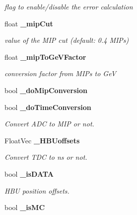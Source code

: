 \begin{DoxyCompactItemize}
\begin{DoxyCompactList}\small\item\em flag to enable/disable the error calculation \item\end{DoxyCompactList}\item 
float {\bf \_\-mipCut}\label{classCALICE_1_1Ahc2CalibrateProcessor_a07cf5b93b24db2acad37b9c14b65011c}

\begin{DoxyCompactList}\small\item\em value of the MIP cut (default: 0.4 MIPs) \item\end{DoxyCompactList}\item 
float {\bf \_\-mipToGeVFactor}\label{classCALICE_1_1Ahc2CalibrateProcessor_a7f34123a00ee631895bda7680794cfb6}

\begin{DoxyCompactList}\small\item\em conversion factor from MIPs to GeV \item\end{DoxyCompactList}\item 
bool {\bfseries \_\-doMipConversion}\label{classCALICE_1_1Ahc2CalibrateProcessor_a263941e7f6da582dd0e4336c2d0443bf}

\item 
bool {\bf \_\-doTimeConversion}\label{classCALICE_1_1Ahc2CalibrateProcessor_aacfee6708f5ebda2f4f14273a508c345}

\begin{DoxyCompactList}\small\item\em Convert ADC to MIP or not. \item\end{DoxyCompactList}\item 
FloatVec {\bf \_\-HBUoffsets}\label{classCALICE_1_1Ahc2CalibrateProcessor_acadbcf61c9aa0b2b3abea6cc2e36d0b7}

\begin{DoxyCompactList}\small\item\em Convert TDC to ns or not. \item\end{DoxyCompactList}\item 
bool {\bf \_\-isDATA}
\begin{DoxyCompactList}\small\item\em HBU position offsets. \item\end{DoxyCompactList}\item 
bool {\bf \_\-isMC}\label{classCALICE_1_1Ahc2CalibrateProcessor_ab5809d2c7f3a1e6cf7deb8ed8fb48f90}


\end{DoxyCompactItemize}
